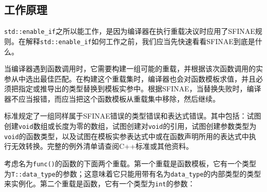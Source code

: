 
\subsection{工作原理}



\texttt{std::\allowbreak{}enable\_\allowbreak{}if}之所以能工作，是因为编译器在执行重载决议时应用了SFINAE规则。在解释\texttt{std::\allowbreak{}enable\_\allowbreak{}if}如何工作之前，我们应当先快速看看SFINAE到底是什么。



当编译器遇到函数调用时，它需要构建一组可能的重载，并根据该次函数调用的实参从中选出最佳匹配。在构建这个重载集时，编译器也会对函数模板求值，并且必须把指定或推导出的类型替换到模板实参中。根据SFINAE，当替换失败时，编译器不应当报错，而应当把这个函数模板从重载集中移除，然后继续。



\begin{myNote}[tip]
标准规定了一组同样属于SFINAE错误的类型错误和表达式错误。其中包括：试图创建\texttt{void}数组或长度为零的数组，试图创建对\texttt{void}的引用，试图创建参数类型为\texttt{void}的函数类型，以及试图在模板实参表达式中或在函数声明所用的表达式中执行无效转换。完整的例外清单请查阅C++标准或其他资料。
\end{myNote}



考虑名为\texttt{func()}的函数的下面两个重载。第一个重载是函数模板，它有一个类型为\texttt{T::\allowbreak{}data\_\allowbreak{}type}的参数；这意味着它只能用带有名为\texttt{data\_\allowbreak{}type}的内部类型的类型来实例化。第二个重载是函数，它有一个类型为\texttt{int}的参数：



